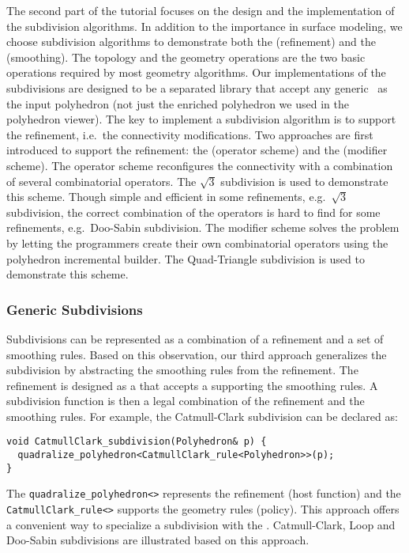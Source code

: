 \documentclass[letter,twocolumn]{article}
\begin{document}
The second part of the tutorial focuses on the design and the
implementation of the subdivision algorithms.  In addition to the
importance in surface modeling, we choose subdivision algorithms to
demonstrate both the  (refinement) and the
 (smoothing). The topology and the geometry
operations are the two basic operations required by most geometry
algorithms. Our implementations of the subdivisions are designed to be
a separated library that accept any generic \poly\ as the input
polyhedron (not just the enriched polyhedron we used in the polyhedron
viewer). The key to implement a subdivision algorithm is to support
the refinement, i.e.\ the connectivity modifications.  Two approaches
are first introduced to support the refinement: the  (operator scheme) and
the  (modifier scheme).  The operator scheme
reconfigures the connectivity with a combination of several
combinatorial operators. The $\sqrt{3}$ subdivision is used to
demonstrate this scheme. Though simple and efficient in some
refinements, e.g.\ $\sqrt{3}$ subdivision, the correct combination of
the operators is hard to find for some refinements, e.g.\ Doo-Sabin
subdivision. The modifier scheme solves the problem by letting the
programmers create their own combinatorial operators using the
polyhedron incremental builder.  The Quad-Triangle subdivision is used
to demonstrate this scheme.

\subsubsection*{Generic Subdivisions}

Subdivisions can be represented as a combination of a refinement and a
set of smoothing rules. Based on this observation, our third approach
generalizes the subdivision by abstracting the smoothing rules from
the refinement. The refinement is designed as a 
that accepts a  supporting the smoothing rules. A
subdivision function is then a legal combination of the refinement and
the smoothing rules.  For example, the Catmull-Clark subdivision can
be declared as:
\begin{lstlisting}
void CatmullClark_subdivision(Polyhedron& p) {    
  quadralize_polyhedron<CatmullClark_rule<Polyhedron>>(p);  
}
\end{lstlisting}
The \lstinline!quadralize_polyhedron<>! represents the refinement
(host function) and the \lstinline!CatmullClark_rule<>! supports the
geometry rules (policy).  This approach offers a convenient way to
specialize a subdivision with the .
Catmull-Clark, Loop and Doo-Sabin subdivisions are illustrated based
on this approach.
\end{document}
